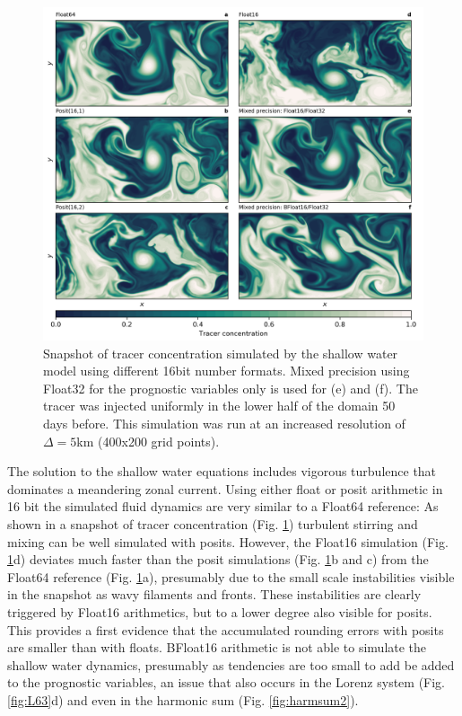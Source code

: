 \documentclass[draft]{agujournal2019}
\begin{document}
\begin{figure}
\includegraphics[width=1\textwidth]{../plots/snapshot.png}
\caption{Snapshot of tracer concentration simulated by the shallow water model using different 16bit number formats. Mixed precision using Float32 for the prognostic variables only is used for (e) and (f). The tracer was injected uniformly in the lower half of the domain 50 days before. This simulation was run at an increased resolution of $\Delta = 5$km (400x200 grid points).}
\label{fig:snapshot}
\end{figure}

The solution to the shallow water equations includes vigorous turbulence that dominates a meandering zonal current. Using either float or posit arithmetic in 16 bit the simulated fluid dynamics are very similar to a Float64 reference: As shown in a snapshot of tracer concentration (Fig. \ref{fig:snapshot}) turbulent stirring and mixing can be well simulated with posits. However, the Float16 simulation (Fig. \ref{fig:snapshot}d) deviates much faster than the posit simulations (Fig. \ref{fig:snapshot}b and c) from the Float64 reference (Fig. \ref{fig:snapshot}a), presumably due to the small scale instabilities visible in the snapshot as wavy filaments and fronts. These instabilities are clearly triggered by Float16 arithmetics, but to a lower degree also visible for posits. This provides a first evidence that the accumulated rounding errors with posits are smaller than with floats. BFloat16 arithmetic is not able to simulate the shallow water dynamics, presumably as tendencies are too small to add be added to the prognostic variables, an issue that also occurs in the Lorenz system (Fig. \ref{fig:L63}d) and even in the harmonic sum (Fig. \ref{fig:harmsum2}).
\end{document}
